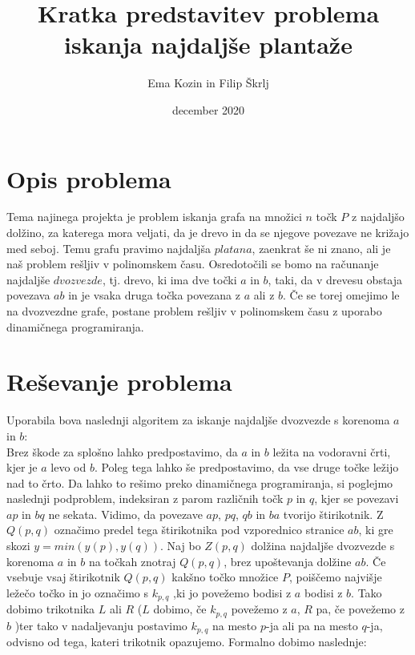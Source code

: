 \documentclass[a4paper,12pt]{article}
\title{Kratka predstavitev problema iskanja najdaljše plantaže}
\author{Ema Kozin in Filip Škrlj}
\date{december 2020}
\begin{document}
\maketitle

\newpage
\section{Opis problema}

Tema najinega projekta je problem iskanja grafa na množici $n$ točk $P$ z najdaljšo dolžino, za katerega mora veljati, da je drevo in da se njegove povezave ne križajo med seboj. Temu grafu pravimo najdaljša $platana$, zaenkrat še ni znano, ali je naš problem rešljiv v polinomskem času.
Osredotočili se bomo na računanje najdaljše $dvozvezde$, tj. drevo, ki ima dve točki $a$ in $b$, taki, da v drevesu obstaja povezava $ab$ in je vsaka druga točka povezana z $a$ ali z $b$. Če se torej omejimo le na dvozvezdne grafe, postane problem rešljiv v polinomskem času z uporabo dinamičnega programiranja.



\section{Reševanje problema}
Uporabila bova naslednji algoritem za iskanje najdaljše dvozvezde s korenoma $a$ in $b$: \\
Brez škode za splošno lahko predpostavimo, da $a$ in $b$ ležita na vodoravni črti, kjer je $a$ levo od $b$. Poleg tega lahko še predpostavimo, da vse druge točke ležijo nad to črto. Da lahko to rešimo preko dinamičnega programiranja, si poglejmo naslednji podproblem, indeksiran z parom različnih točk $p$ in $q$, kjer se povezavi $ap$ in $bq$ ne sekata. Vidimo, da povezave $ap$, $pq$, $qb$ in $ba$ tvorijo štirikotnik. Z $Q(p,q)$ označimo predel tega štirikotnika pod vzporednico stranice $ab$, ki gre skozi $y = min(y(p),y(q))$.
Naj bo $Z(p,q)$ dolžina najdaljše dvozvezde s korenoma $a$ in $b$ na točkah znotraj $Q(p,q)$, brez upoštevanja dolžine $ab$. Če vsebuje vsaj štirikotnik $Q(p,q)$ kakšno točko množice $P$, poiščemo najvišje ležečo točko in jo označimo s $k_{p,q}$ ,ki jo povežemo bodisi z $a$ bodisi z $b$. Tako dobimo  trikotnika $L$ ali $R$ ($L$ dobimo, če $k_{p,q}$ povežemo z $a$, $R$ pa, če povežemo z $b$ )ter tako v nadaljevanju postavimo $k_{p,q}$ na mesto $p$-ja ali pa na mesto $q$-ja, odvisno od tega, kateri trikotnik opazujemo. Formalno dobimo naslednje: \\
\end{document}
